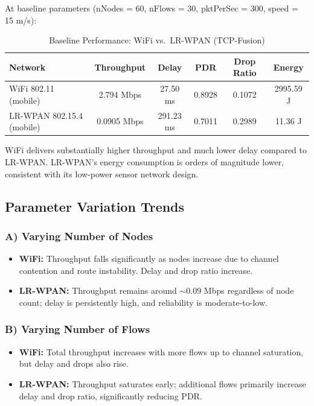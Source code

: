 \documentclass[12pt,a4paper]{article}
\begin{document}
At baseline parameters (nNodes = 60, nFlows = 30, pktPerSec = 300, speed = 15 m/s):

\begin{table}[htbp]
\centering
\caption{Baseline Performance: WiFi vs.\ LR-WPAN (TCP-Fusion)}
\begin{tabular}{@{}lccccc@{}}
\toprule
\textbf{Network} & \textbf{Throughput} & \textbf{Delay} & \textbf{PDR} & \textbf{Drop Ratio} & \textbf{Energy} \\
\midrule
WiFi 802.11 (mobile) & 2.794 Mbps & 27.50 ms & 0.8928 & 0.1072 & 2995.59 J \\
LR-WPAN 802.15.4 (mobile) & 0.0905 Mbps & 291.23 ms & 0.7011 & 0.2989 & 11.36 J \\
\bottomrule
\end{tabular}
\end{table}

WiFi delivers substantially higher throughput and much lower delay compared to LR-WPAN. LR-WPAN's energy consumption is orders of magnitude lower, consistent with its low-power sensor network design.

\subsection{Parameter Variation Trends}

\subsubsection{A) Varying Number of Nodes}
\begin{itemize}
    \item \textbf{WiFi:} Throughput falls significantly as nodes increase due to channel contention and route instability. Delay and drop ratio increase.
    \item \textbf{LR-WPAN:} Throughput remains around $\sim$0.09 Mbps regardless of node count; delay is persistently high, and reliability is moderate-to-low.
\end{itemize}

\subsubsection{B) Varying Number of Flows}
\begin{itemize}
    \item \textbf{WiFi:} Total throughput increases with more flows up to channel saturation, but delay and drops also rise.
    \item \textbf{LR-WPAN:} Throughput saturates early; additional flows primarily increase delay and drop ratio, significantly reducing PDR.
\end{itemize}
\end{document}
